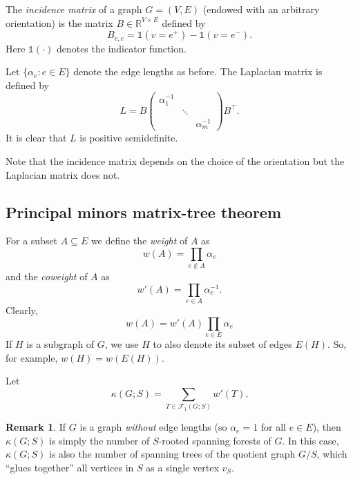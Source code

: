 \documentclass[12pt]{amsart}
\theoremstyle{definition}
\newtheorem{rmk}[thm]{Remark}
\newcommand{\RR}{\mathbb{R}}
\newcommand{\one}{\mathds{1}}
\newcommand{\La}{L}
\newcommand{\tr}{\intercal}
\newcommand{\trees}{\mathcal{F}_1}
\begin{document}
The {\em incidence matrix} of a graph $G = (V,E)$ (endowed with an arbitrary orientation) is the matrix $B \in \RR^{V \times E}$ defined by
\[
	B_{v, e} = \one(v = e^+) - \one(v = e^-).
\]
Here $\one(\cdot)$ denotes the indicator function.

Let $\{ \alpha_e \colon e \in E\}$ denote the edge lengths as before. The Laplacian matrix is defined by
\begin{equation}
\label{eq:weighted-laplacian}
	\La = B \begin{pmatrix}
	\alpha_1^{-1} & & \\
	& \ddots & \\
	& & \alpha_m^{-1}
	\end{pmatrix} B^\tr .
\end{equation}
It is clear that $\La$ is positive semidefinite. 

Note that the incidence matrix depends on the choice of the orientation but the Laplacian matrix does not.


\subsection{Principal minors matrix-tree theorem}

For a subset $A \subseteq E$ we define the {\em weight} of $A$ as
\[
	w(A) = \prod_{e \not\in A} \alpha_e
\]
and the {\em coweight} of $A$ as
\[
	w'(A) = \prod_{e \in A} \alpha_e^{-1}.
\]
Clearly, 
\begin{equation} \label{weight-coweight}
w(A) = w'(A) \prod_{e \in E} \alpha_e 
\end{equation}
If $H$ is a subgraph of $G$, we use $H$ to also denote its subset of edges $E(H)$. So, for example, $w(H) = w\left(E(H)\right)$.

Let 
\[
	\kappa(G;S) = \sum_{T \in \trees(G; S)} w'(T) .
\]

\begin{rmk}
If $G$ is a graph {\em without} edge lengths (so $\alpha_e=1$ for all $e \in E$), then $\kappa(G;S)$ is simply the number of $S$-rooted spanning forests of $G$.
In this case, $\kappa(G;S)$ is also the number of spanning trees of the quotient graph $G / S$, which ``glues together'' all vertices in $S$ as a single vertex $v_S$.
\end{rmk}

\end{document}
